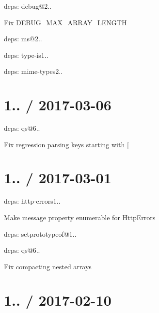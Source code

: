 \begin{DoxyItemize}
\item deps\+: debug@2..
\begin{DoxyItemize}
\item Fix {\ttfamily D\+E\+B\+U\+G\+\_\+\+M\+A\+X\+\_\+\+A\+R\+R\+A\+Y\+\_\+\+L\+E\+N\+G\+TH}
\item deps\+: ms@2..
\end{DoxyItemize}
\item deps\+: type-\/is1..
\begin{DoxyItemize}
\item deps\+: mime-\/types2..
\end{DoxyItemize}
\end{DoxyItemize}

\section*{1.. / 2017-\/03-\/06 }


\begin{DoxyItemize}
\item deps\+: qs@6..
\begin{DoxyItemize}
\item Fix regression parsing keys starting with {\ttfamily \mbox{[}}
\end{DoxyItemize}
\end{DoxyItemize}

\section*{1.. / 2017-\/03-\/01 }


\begin{DoxyItemize}
\item deps\+: http-\/errors1..
\begin{DoxyItemize}
\item Make {\ttfamily message} property enumerable for {\ttfamily Http\+Error}s
\item deps\+: setprototypeof@1..
\end{DoxyItemize}
\item deps\+: qs@6..
\begin{DoxyItemize}
\item Fix compacting nested arrays
\end{DoxyItemize}
\end{DoxyItemize}

\section*{1.. / 2017-\/02-\/10 }


